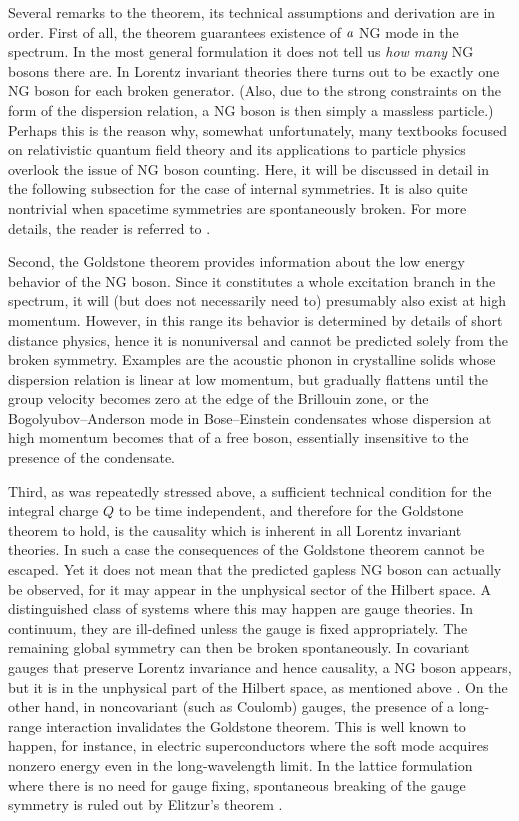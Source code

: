 \documentclass[final,2p,times,12pt,sort&compress]{elsarticle}
\begin{document}
Several remarks to the theorem, its technical assumptions and derivation are in
order. First of all, the theorem guarantees existence of $\emph{a}$ NG mode in
the spectrum. In the most general formulation it does not tell us \emph{how
many} NG bosons there are. In Lorentz invariant theories there turns out to be
exactly one NG boson for each broken generator. (Also, due to the strong
constraints on the form of the dispersion relation, a NG boson is then simply a
massless particle.) Perhaps this is the reason why, somewhat unfortunately,
many textbooks focused on relativistic quantum field theory and its
applications to particle physics overlook the issue of NG boson counting. Here,
it will be discussed in detail in the following subsection for the case of
internal symmetries. It is also quite nontrivial when spacetime symmetries are
spontaneously broken. For more details, the reader is referred to
\cite{Low:2001bw}.

Second, the Goldstone theorem provides information about the low energy
behavior of the NG boson. Since it constitutes a whole excitation branch in the
spectrum, it will (but does not necessarily need to) presumably also exist at
high momentum. However, in this range its behavior is determined by details of
short distance physics, hence it is nonuniversal and cannot be predicted solely
from the broken symmetry. Examples are the acoustic phonon in crystalline
solids whose dispersion relation is linear at low momentum, but gradually
flattens until the group velocity becomes zero at the edge of the Brillouin
zone, or the Bogolyubov--Anderson mode in Bose--Einstein condensates whose
dispersion at high momentum becomes that of a free boson, essentially
insensitive to the presence of the condensate.

Third, as was repeatedly stressed above, a sufficient technical condition for
the integral charge $Q$ to be time independent, and therefore for the Goldstone
theorem to hold, is the causality which is inherent in all Lorentz invariant
theories. In such a case the consequences of the Goldstone theorem cannot be
escaped. Yet it does not mean that the predicted gapless NG boson can actually
be observed, for it may appear in the unphysical sector of the Hilbert space.
A distinguished class of systems where this may happen are gauge theories.
In continuum, they are ill-defined unless the gauge is fixed appropriately.
The remaining global symmetry can then be broken spontaneously. In
covariant gauges that preserve Lorentz invariance and hence causality, a NG
boson appears, but it is in the unphysical part of the Hilbert space, as
mentioned above \cite{Boulware:1962zz,Englert:1964et,Guralnik:1964eu}. On the
other hand, in noncovariant (such as Coulomb) gauges, the presence of
a long-range interaction invalidates the Goldstone theorem. This is well known
to happen, for instance, in electric superconductors where the soft mode
acquires nonzero energy even in the long-wavelength limit. In the lattice
formulation where there is no need for gauge fixing, spontaneous breaking of
the gauge symmetry is ruled out by Elitzur's theorem \cite{Elitzur:1975im}.
\end{document}
